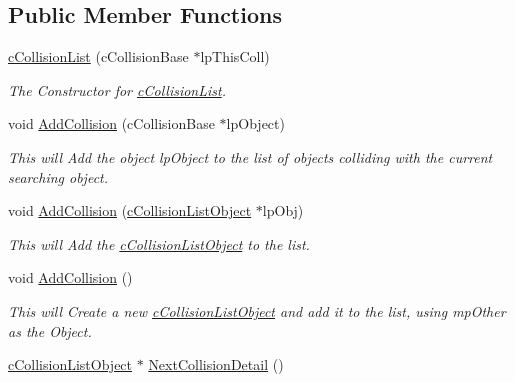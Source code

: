 \subsection*{Public Member Functions}
\begin{DoxyCompactItemize}
\item 
\hypertarget{classc_collision_list_ad6d48f0ea2b3bfa0785a573398187d0d}{
\hyperlink{classc_collision_list_ad6d48f0ea2b3bfa0785a573398187d0d}{cCollisionList} (cCollisionBase $\ast$lpThisColl)}
\label{classc_collision_list_ad6d48f0ea2b3bfa0785a573398187d0d}

\begin{DoxyCompactList}\small\item\em The Constructor for \hyperlink{classc_collision_list}{cCollisionList}. \end{DoxyCompactList}\item 
\hypertarget{classc_collision_list_a6c8192f17cc67e6f7b364381d970b9be}{
void \hyperlink{classc_collision_list_a6c8192f17cc67e6f7b364381d970b9be}{AddCollision} (cCollisionBase $\ast$lpObject)}
\label{classc_collision_list_a6c8192f17cc67e6f7b364381d970b9be}

\begin{DoxyCompactList}\small\item\em This will Add the object lpObject to the list of objects colliding with the current searching object. \end{DoxyCompactList}\item 
\hypertarget{classc_collision_list_a6d9e443db874b3c4f8c4e6609be5bad5}{
void \hyperlink{classc_collision_list_a6d9e443db874b3c4f8c4e6609be5bad5}{AddCollision} (\hyperlink{classc_collision_list_object}{cCollisionListObject} $\ast$lpObj)}
\label{classc_collision_list_a6d9e443db874b3c4f8c4e6609be5bad5}

\begin{DoxyCompactList}\small\item\em This will Add the \hyperlink{classc_collision_list_object}{cCollisionListObject} to the list. \end{DoxyCompactList}\item 
\hypertarget{classc_collision_list_a9dc048e75aaaa2e92aa4af743345d8fd}{
void \hyperlink{classc_collision_list_a9dc048e75aaaa2e92aa4af743345d8fd}{AddCollision} ()}
\label{classc_collision_list_a9dc048e75aaaa2e92aa4af743345d8fd}

\begin{DoxyCompactList}\small\item\em This will Create a new \hyperlink{classc_collision_list_object}{cCollisionListObject} and add it to the list, using mpOther as the Object. \end{DoxyCompactList}\item 
\hypertarget{classc_collision_list_a88c7b96567c9fca6bcbf018e9439c641}{
\hyperlink{classc_collision_list_object}{cCollisionListObject} $\ast$ \hyperlink{classc_collision_list_a88c7b96567c9fca6bcbf018e9439c641}{NextCollisionDetail} ()}
\label{classc_collision_list_a88c7b96567c9fca6bcbf018e9439c641}


\end{DoxyCompactItemize}
